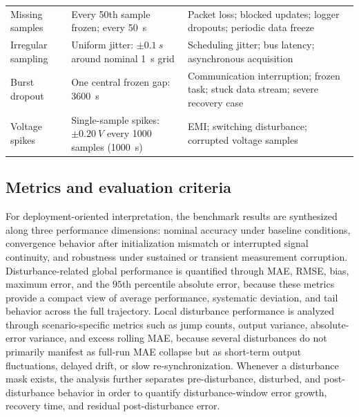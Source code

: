 \documentclass[review,nopreprintline]{elsarticle}
\begin{document}
\begin{longtable}{@{}p{1.55cm}p{3.65cm}p{5.75cm}@{}}
    \addlinespace[2pt]
    Missing samples & Every 50th sample frozen; every \SI{50}{s} & Packet loss; blocked updates; logger dropouts; periodic data freeze \cite{naseriReliableWirelessBMS2025,liuAssessingImpactSampling2025} \\
    \addlinespace[2pt]
    Irregular sampling & Uniform jitter: $\pm\SI{0.1}{s}$ around nominal \SI{1}{s} grid & Scheduling jitter; bus latency; asynchronous acquisition \cite{bergerBenchmarkingBatteryManagement2024,naseriReliableWirelessBMS2025,liuAssessingImpactSampling2025} \\
    \addlinespace[2pt]
    Burst dropout & One central frozen gap: \SI{3600}{s} & Communication interruption; frozen task; stuck data stream; severe recovery case \cite{bergerBenchmarkingBatteryManagement2024,naseriReliableWirelessBMS2025} \\
    \addlinespace[2pt]
    Voltage spikes & Single-sample spikes: $\pm\SI{0.20}{V}$ every 1000 samples (\SI{1000}{s}) & EMI; switching disturbance; corrupted voltage samples \cite{aielloElectromagneticSusceptibilityBattery2020} \\
\end{longtable}
\endgroup

\subsection{Metrics and evaluation criteria}
For deployment-oriented interpretation, the benchmark results are synthesized along three performance dimensions: nominal accuracy under baseline conditions, convergence behavior after initialization mismatch or interrupted signal continuity, and robustness under sustained or transient measurement corruption. Disturbance-related global performance is quantified through MAE, RMSE, bias, maximum error, and the $95$th percentile absolute error, because these metrics provide a compact view of average performance, systematic deviation, and tail behavior across the full trajectory. Local disturbance performance is analyzed through scenario-specific metrics such as jump counts, output variance, absolute-error variance, and excess rolling MAE, because several disturbances do not primarily manifest as full-run MAE collapse but as short-term output fluctuations, delayed drift, or slow re-synchronization. Whenever a disturbance mask exists, the analysis further separates pre-disturbance, disturbed, and post-disturbance behavior in order to quantify disturbance-window error growth, recovery time, and residual post-disturbance error.
\end{document}
